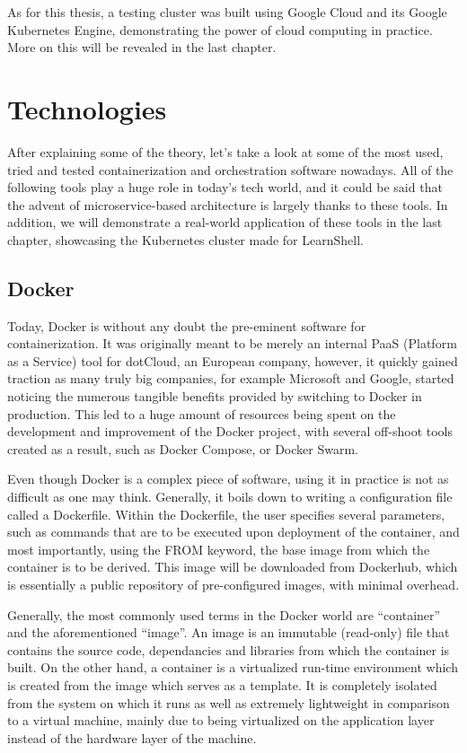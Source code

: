 \documentclass[thesis=B,english]{FITthesis}[2019/12/23]
\begin{document}
As for this thesis, a testing cluster was built using Google Cloud and its Google Kubernetes Engine, demonstrating the power of cloud computing in practice. More on this will be revealed in the last chapter.


\section{Technologies}

After explaining some of the theory, let's take a look at some of the most used, tried and tested containerization and orchestration software nowadays. All of the following tools play a huge role in today's tech world, and it could be said that the advent of microservice-based architecture is largely thanks to these tools. In addition, we will demonstrate a real-world application of these tools in the last chapter, showcasing the Kubernetes cluster made for LearnShell.

\subsection{Docker}

Today, Docker is without any doubt the pre-eminent software for containerization. It was originally meant to be merely an internal PaaS (Platform as a Service) tool for dotCloud, an European company, however, it quickly gained traction as many truly big companies, for example Microsoft and Google, started noticing the numerous tangible benefits provided by switching to Docker in production. \cite{docker-java} This led to a huge amount of resources being spent on the development and improvement of the Docker project, with several off-shoot tools created as a result, such as Docker Compose, or Docker Swarm.

Even though Docker is a complex piece of software, using it in practice is not as difficult as one may think. Generally, it boils down to writing a configuration file called a Dockerfile. Within the Dockerfile, the user specifies several parameters, such as commands that are to be executed upon deployment of the container, and most importantly, using the FROM keyword, the base image from which the container is to be derived. This image will be downloaded from Dockerhub, which is essentially a public repository of pre-configured images, with minimal overhead. 

Generally, the most commonly used terms in the Docker world are “container” and the aforementioned “image”. An image is an immutable (read-only) file that contains the source code, dependancies and libraries from which the container is built. On the other hand, a container is a virtualized run-time environment which is created from the image which serves as a template. \cite{docker-phoenix} It is completely isolated from the system on which it runs as well as extremely lightweight in comparison to a virtual machine, mainly due to being virtualized on the application layer instead of the hardware layer of the machine. 
\end{document}
